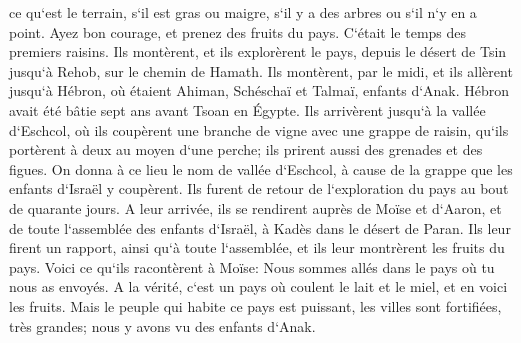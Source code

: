 \verse ce qu`est le terrain, s`il est gras ou maigre, s`il y a des arbres ou s`il n`y en a point. Ayez bon courage, et prenez des fruits du pays. C`était le temps des premiers raisins. 
\verse Ils montèrent, et ils explorèrent le pays, depuis le désert de Tsin jusqu`à Rehob, sur le chemin de Hamath. 
\verse Ils montèrent, par le midi, et ils allèrent jusqu`à Hébron, où étaient Ahiman, Schéschaï et Talmaï, enfants d`Anak. Hébron avait été bâtie sept ans avant Tsoan en Égypte. 
\verse Ils arrivèrent jusqu`à la vallée d`Eschcol, où ils coupèrent une branche de vigne avec une grappe de raisin, qu`ils portèrent à deux au moyen d`une perche; ils prirent aussi des grenades et des figues. 
\verse On donna à ce lieu le nom de vallée d`Eschcol, à cause de la grappe que les enfants d`Israël y coupèrent. 
\verse Ils furent de retour de l`exploration du pays au bout de quarante jours. 
\verse A leur arrivée, ils se rendirent auprès de Moïse et d`Aaron, et de toute l`assemblée des enfants d`Israël, à Kadès dans le désert de Paran. Ils leur firent un rapport, ainsi qu`à toute l`assemblée, et ils leur montrèrent les fruits du pays. 
\verse Voici ce qu`ils racontèrent à Moïse: Nous sommes allés dans le pays où tu nous as envoyés. A la vérité, c`est un pays où coulent le lait et le miel, et en voici les fruits. 
\verse Mais le peuple qui habite ce pays est puissant, les villes sont fortifiées, très grandes; nous y avons vu des enfants d`Anak. 
